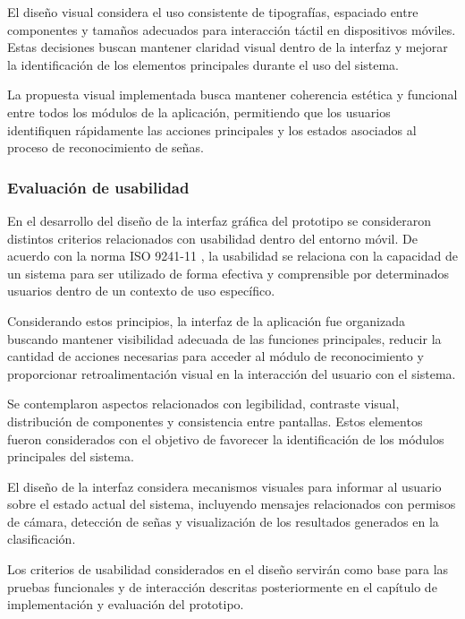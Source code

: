 	El diseño visual considera el uso consistente de tipografías,
	espaciado entre componentes y tamaños adecuados para interacción táctil en
	dispositivos móviles. Estas decisiones buscan mantener claridad visual dentro de
	la interfaz y mejorar la identificación de los elementos principales durante el
	uso del sistema.
	
	La propuesta visual implementada busca mantener coherencia estética y
	funcional entre todos los módulos de la aplicación, permitiendo que los usuarios
	identifiquen rápidamente las acciones principales y los estados asociados al
	proceso de reconocimiento de señas.

	
	\subsubsection{Evaluación de usabilidad}
	
	En el desarrollo del diseño de la interfaz gráfica del prototipo se consideraron distintos
	criterios relacionados con usabilidad dentro del entorno móvil. De acuerdo con la
	norma ISO 9241-11 \cite{iso9241usability}, la usabilidad se relaciona con la
	capacidad de un sistema para ser utilizado de forma efectiva y comprensible por
	determinados usuarios dentro de un contexto de uso específico.
	
	Considerando estos principios, la interfaz de la aplicación fue organizada
	buscando mantener visibilidad adecuada de las funciones principales, reducir la
	cantidad de acciones necesarias para acceder al módulo de reconocimiento y
	proporcionar retroalimentación visual en la interacción del usuario con el
	sistema.
	
	Se contemplaron aspectos relacionados con legibilidad, contraste visual,
	distribución de componentes y consistencia entre pantallas. Estos elementos fueron
	considerados con el objetivo de
	favorecer la identificación de los módulos principales del sistema.
	
	El diseño de la interfaz considera mecanismos visuales para
	informar al usuario sobre el estado actual del sistema, incluyendo mensajes
	relacionados con permisos de cámara, detección de señas y visualización de los
	resultados generados en la clasificación.
	
	Los criterios de usabilidad considerados en el diseño servirán
	como base para las pruebas funcionales y de interacción descritas posteriormente
	en el capítulo de implementación y evaluación del prototipo.
	
	
	\newpage
	

